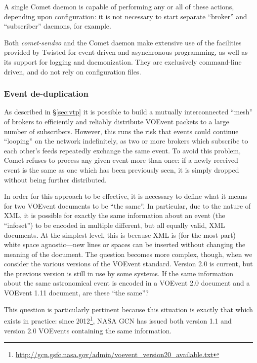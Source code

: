 \documentclass[5p,authoryear]{elsarticle}
\begin{document}
A single Comet daemon is capable of performing any or all of these actions,
depending upon configuration: it is not necessary to start separate ``broker''
and ``subscriber'' daemons, for example.

Both \textit{comet-sendvo} and the Comet daemon make extensive use of the
facilities provided by Twisted for event-driven and asynchronous programming,
as well as its support for logging and daemonization. They are exclusively
command-line driven, and do not rely on configuration files.

\subsubsection{Event de-duplication}
\label{sec:design:dedup}

As described in \S\ref{sec:vtp} it is possible to build a mutually
interconnected ``mesh'' of brokers to efficiently and reliably distribute
VOEvent packets to a large number of subscribers. However, this runs the risk
that events could continue ``looping'' on the network indefinitely, as two or
more brokers which subscribe to each other's feeds repeatedly exchange the
same event. To avoid this problem, Comet refuses to process any given event
more than once: if a newly received event is the same as one which has been
previously seen, it is simply dropped without being further distributed.

In order for this approach to be effective, it is necessary to define what it
means for two VOEvent documents to be ``the same''. In particular, due to the
nature of XML, it is possible for exactly the same information about an event
(the ``infoset'') to be encoded in multiple different, but all equally valid,
XML documents. At the simplest level, this is because XML is (for the most
part) white space agnostic---new lines or spaces can be inserted without
changing the meaning of the document. The question becomes more complex,
though, when we consider the various versions of the VOEvent standard. Version
2.0 \citep{Seaman:2011} is current, but the previous version
\citep[1.1;][]{Seaman:2006} is still in use by some systems. If the same
information about the same astronomical event is encoded in a VOEvent 2.0
document and a VOEvent 1.11 document, are these ``the same''?

This question is particularly pertinent because this situation is exactly that
which exists in practice: since
2012\footnote{\url{http://gcn.gsfc.nasa.gov/admin/voevent_version20_available.txt}},
NASA GCN has issued both version 1.1 and version 2.0 VOEvents containing the
same information.
\end{document}

